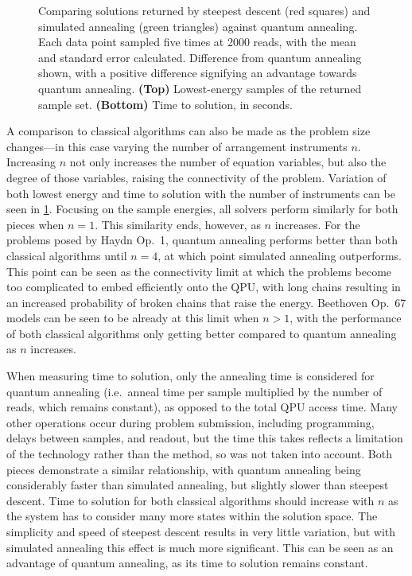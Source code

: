 \documentclass[12pt]{article}
\theoremstyle{definition}
\begin{document}
\begin{figure}[!b]
    \centering\footnotesize
    
    \caption{Comparing solutions returned by steepest descent (red squares) and simulated annealing (green triangles) against quantum annealing. Each data point sampled five times at \num{2000} reads, with the mean and standard error calculated. Difference from quantum annealing shown, with a positive difference signifying an advantage towards quantum annealing. \textbf{(Top)} Lowest-energy samples of the returned sample set. \textbf{(Bottom)} Time to solution, in seconds.}
    \label{fig:scaling}
\end{figure}

A comparison to classical algorithms can also be made as the problem size changes---in this case varying the number of arrangement instruments $n$. Increasing $n$ not only increases the number of equation variables, but also the degree of those variables, raising the connectivity of the problem. Variation of both lowest energy and time to solution with the number of instruments can be seen in \cref{fig:scaling}. Focusing on the sample energies, all solvers perform similarly for both pieces when $n=1$. This similarity ends, however, as $n$ increases. For the problems posed by Haydn Op.\ 1, quantum annealing performs better than both classical algorithms until $n=4$, at which point simulated annealing outperforms. This point can be seen as the connectivity limit at which the problems become too complicated to embed efficiently onto the QPU, with long chains resulting in an increased probability of broken chains that raise the energy. Beethoven Op.\ 67 models can be seen to be already at this limit when $n>1$, with the performance of both classical algorithms only getting better compared to quantum annealing as $n$ increases.

When measuring time to solution, only the annealing time is considered for quantum annealing (i.e.\ anneal time per sample multiplied by the number of reads, which remains constant), as opposed to the total QPU access time. Many other operations occur during problem submission, including programming, delays between samples, and readout, but the time this takes reflects a limitation of the technology rather than the method, so was not taken into account. Both pieces demonstrate a similar relationship, with quantum annealing being considerably faster than simulated annealing, but slightly slower than steepest descent. Time to solution for both classical algorithms should increase with $n$ as the system has to consider many more states within the solution space. The simplicity and speed of steepest descent results in very little variation, but with simulated annealing this effect is much more significant. This can be seen as an advantage of quantum annealing, as its time to solution remains constant.
\end{document}

